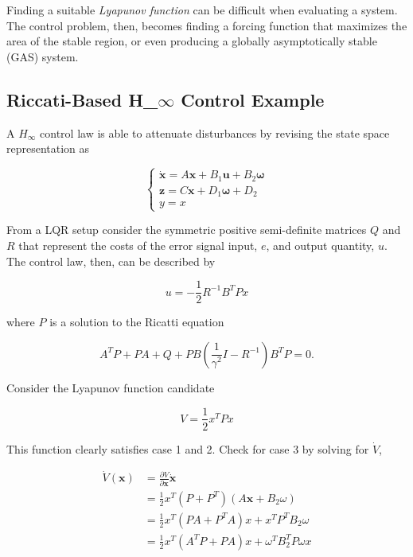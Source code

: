 Finding a suitable \textit{Lyapunov function} can be difficult when evaluating a system. The control problem, then, becomes finding a forcing function that maximizes the area of the stable region, or even producing a globally asymptotically stable (GAS) system. 

\subsection{Riccati-Based H_{$\infty$} Control Example}

A $H_{\infty}$ control law is able to attenuate disturbances by revising the state space representation as 

\begin{equation}
    \begin{cases}
    \dot{\bm{x}} = A \bm{x} + B_1 \bm{u} + B_2 \bm{\omega} \\
    \bm{z} = C\bm{x} + D_1 \bm{\omega} + D_2 \\
    y = x
    \end{cases}
\end{equation}

From a LQR setup consider the symmetric positive semi-definite matrices $Q$ and $R$ that represent the costs of the error signal input, $e$, and output quantity, $u$. The control law, then, can be described by

\begin{equation}
    u = -\frac{1}{2} R^{-1} B^T P x
\end{equation}

where $P$ is a solution to the Ricatti equation

\begin{equation}
    A^T P + P A + Q + P B \left( \frac{1}{\gamma^2} I - R^{-1} \right) B^T P = 0.
\end{equation}

Consider the Lyapunov function candidate

\begin{equation}
    V = \frac{1}{2} x^T P x
\end{equation}

This function clearly satisfies case 1 and 2. Check for case 3 by solving for $\dot{V}$,

\begin{equation}
    \begin{aligned}
    \dot{V}(\bm{x}) &= \frac{\partial V}{\partial \bm{x}} \dot{\bm{x}} \\
    &= \frac{1}{2} x^T (P+P^T) (A\bm{x} + B_2 \omega)\\
    &= \frac{1}{2} x^T (PA + P^T A) x + x^T P^T B_2 \omega \\
    &= \frac{1}{2} x^T (A^T P + PA) x +  \omega^T B_2^T P \omega x
    \end{aligned}
\end{equation}

